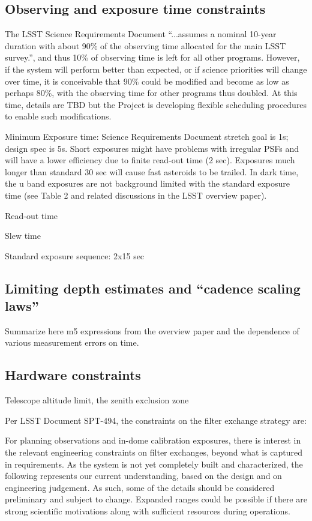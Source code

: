 \documentclass[DM,lsstdraft,toc,usenatbib]{lsstdoc}
\begin{document}
\subsection{Observing and exposure time constraints}

The LSST Science Requirements Document  ``...assumes a nominal 10-year duration with about 90\% 
of the observing time allocated for the main LSST survey.'', and thus 10\% of observing time is left for 
all other programs. However, if the system will perform better than expected, or if science priorities 
will change over time, it is conceivable that 90\% could be modified and become as low as perhaps 80\%, 
with the observing time for other programs thus doubled. At this time, details are TBD but the Project
is developing flexible scheduling procedures to enable such modifications. 

Minimum Exposure time: Science Requirements Document stretch goal is 1s; design spec is 5s.
Short exposures might have problems with irregular PSFs and will have a lower efficiency due to
finite read-out time (2 sec). Exposures much longer than standard 30 sec will cause fast asteroids
to be trailed. In dark time, the u band exposures are not background limited with the standard
exposure time (see Table 2 and related discussions in the LSST overview paper). 

Read-out time 

Slew time 

Standard exposure sequence: 2x15 sec 


\subsection{Limiting depth estimates and ``cadence scaling laws''} 

Summarize here m5 expressions from the overview paper and the dependence
of various measurement errors on time. 


\subsection{Hardware constraints}


Telescope altitude limit, the zenith exclusion zone 


Per LSST Document SPT-494, the constraints on the filter exchange strategy are: 

For planning observations and in-dome calibration exposures, there is interest in the relevant engineering constraints on filter exchanges, beyond what is captured in requirements. As the system is not yet completely built and characterized, the following represents our current understanding, based on the design and on engineering judgement. As such, some of the details should be considered preliminary and subject to change. Expanded ranges could be possible if there are strong scientific motivations along with sufficient resources during operations.
\end{document}
